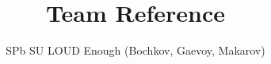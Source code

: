\documentclass[11pt,a4paper,russian,landscape,twocolumn]{article}
\title{Team Reference}
\author{SPb SU LOUD Enough (Bochkov, Gaevoy, Makarov)}
\def\sqgrid{
	\newpage

	\begin{figure} \centering \tikz{
			\foreach \x in {0,...,50} { %
				\draw[color=gray,opacity=0.45] (0, 0.5 * \x cm) -- (17, 0.5 * \x cm);
				}
				\foreach \x in {0,...,34} { %
					\draw[color=gray,opacity=0.45] (0.5 * \x cm, 0) -- (0.5 * \x cm, 25);
					}
	} \end{figure}
}
\def\dotgrid{
	\newpage

	\begin{figure} \centering \tikz{
			\foreach \x in {0,...,50} {
				\foreach \y in {0,...,34} {
					\fill[fill=gray,opacity=0.45] (0.5 * \y cm, 0.5 * \x cm)
					node{\textcolor{gray}{.}};
					};
					}
	} \end{figure}
}
\begin{document}

\tableofcontents


\newcommand{\code}{code/formatted}




\end{document}
